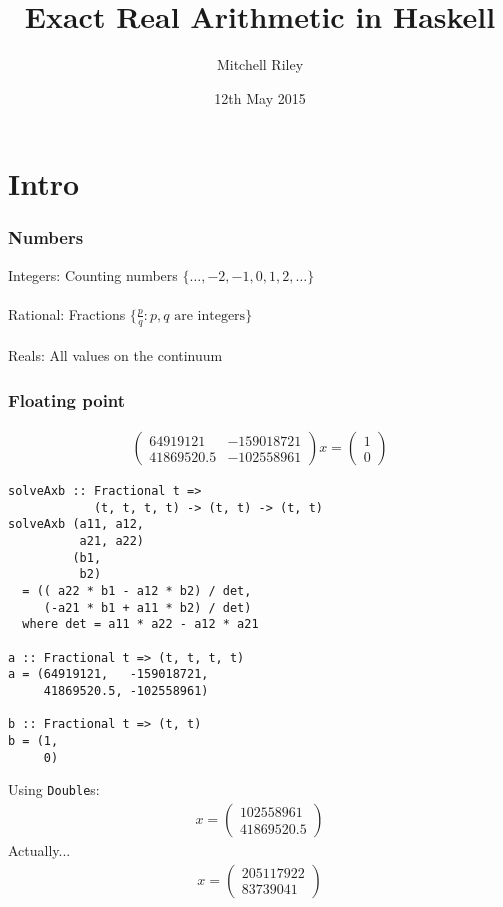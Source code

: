 \documentclass[11pt,aspectratio=169]{beamer}
\author{Mitchell Riley}
\title{Exact Real Arithmetic in Haskell}
\date{12th May 2015}
\begin{document}
\begin{frame}
\titlepage
\end{frame}

\section{Intro}

\begin{frame}
\frametitle{Numbers}
Integers: Counting numbers $\{\dots, -2, -1, 0, 1, 2, \dots\}$
\\~\\
Rational: Fractions $\{\frac{p}{q} : p, q \text{ are integers}\}$
\\~\\
Reals: All values on the continuum
\end{frame}

\begin{frame}
\frametitle{Floating point}
\begin{align*}
\begin{pmatrix}
64919121   & -159018721 \\
41869520.5 & -102558961
\end{pmatrix} x =
\begin{pmatrix}
1 \\
0
\end{pmatrix}
\end{align*}
\end{frame}

\begin{frame}[fragile]
\begin{verbatim}
solveAxb :: Fractional t =>
            (t, t, t, t) -> (t, t) -> (t, t)
solveAxb (a11, a12,
          a21, a22)
         (b1,
          b2)
  = (( a22 * b1 - a12 * b2) / det,
     (-a21 * b1 + a11 * b2) / det)
  where det = a11 * a22 - a12 * a21

a :: Fractional t => (t, t, t, t)
a = (64919121,   -159018721,
     41869520.5, -102558961)

b :: Fractional t => (t, t)
b = (1,
     0)
\end{verbatim}
\end{frame}

\begin{frame}
Using \texttt{Double}s:
\begin{align*}
x =
\begin{pmatrix}
102558961 \\
41869520.5
\end{pmatrix}
\end{align*}
\pause
Actually...
\begin{align*}
x =
\begin{pmatrix}
205117922 \\
83739041
\end{pmatrix}
\end{align*}
\end{frame}
\end{document}
